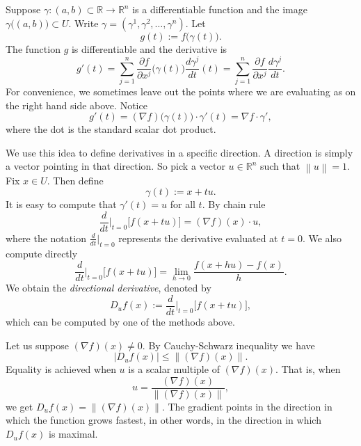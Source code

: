 \documentclass[12pt]{book}
\newcommand{\abs}[1]{\left\lvert {#1} \right\rvert}
\newcommand{\norm}[1]{\left\lVert {#1} \right\rVert}
\newcommand{\R}{{\mathbb{R}}}
\newcommand{\myindex}[1]{#1\index{#1}}
\theoremstyle{plain}
\theoremstyle{remark}
\theoremstyle{definition}
\theoremstyle{exercise}
\theoremstyle{example}
\begin{document}
Suppose $\gamma \colon (a,b) \subset \R \to \R^n$ is a differentiable
function and the image $\gamma\bigl((a,b)\bigr) \subset U$.  Write $\gamma =
(\gamma^1,\gamma^2,\ldots,\gamma^n)$.  Let
\begin{equation*}
g(t) := f\bigl(\gamma(t)\bigr) .
\end{equation*}
The function
$g$ is differentiable and the derivative is
\begin{equation*}
g'(t) =
\sum_{j=1}^n
\frac{\partial f}{\partial x^j} \bigl(\gamma(t)\bigr)
\frac{d\gamma^j}{dt} (t)
=
\sum_{j=1}^n
\frac{\partial f}{\partial x^j}
\frac{d\gamma^j}{dt} .
\end{equation*}
For convenience,
we sometimes 
leave out the points where we are evaluating as on the right hand side above.
Notice
\begin{equation*}
g'(t) = (\nabla f) \bigl(\gamma(t)\bigr) \cdot \gamma'(t)
= \nabla f \cdot \gamma' ,
\end{equation*}
where the dot is the standard scalar dot product.

We use this idea to define derivatives in a specific direction.  A direction
is simply a vector pointing in that direction.  So pick a vector $u \in \R^n$
such that $\norm{u} = 1$.  Fix $x \in U$.
Then define
\begin{equation*}
\gamma(t) := x + tu .
\end{equation*}
It is easy to compute that $\gamma'(t) = u$ for all $t$.  
By chain rule
\begin{equation*}
\frac{d}{dt}\Big|_{t=0} \bigl[ f(x+tu) \bigr] =
(\nabla f) (x) \cdot u ,
\end{equation*}
where the notation
$\frac{d}{dt}\big|_{t=0}$ represents the derivative evaluated at $t=0$.
We also compute directly
\begin{equation*}
\frac{d}{dt}\Big|_{t=0} \bigl[ f(x+tu) \bigr] =
\lim_{h\to 0}
\frac{f(x+hu)-f(x)}{h} .
\end{equation*}
We obtain the \emph{\myindex{directional derivative}},
denoted by
\begin{equation*}
D_u f (x) := \frac{d}{dt}\Big|_{t=0} \bigl[ f(x+tu) \bigr] ,
\end{equation*}
which can be computed by one of the methods above.

Let us suppose $(\nabla f)(x) \neq 0$.
By Cauchy-Schwarz inequality we have
\begin{equation*}
\abs{D_u f(x)} \leq \norm{(\nabla f)(x)} .
\end{equation*}
Equality is achieved when $u$ is a scalar multiple of
$(\nabla f)(x)$.  That is, when
\begin{equation*}
u = 
\frac{(\nabla f)(x)}{\norm{(\nabla f)(x)}} ,
\end{equation*}
we get $D_u f(x) = \norm{(\nabla f)(x)}$.
The gradient points in the direction in which the
function grows fastest, in other words, in the direction in which $D_u f(x)$ is maximal.
\end{document}
